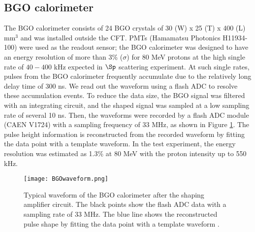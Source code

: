 %
\subsection{BGO calorimeter}
The BGO calorimeter consists of 24 BGO crystals of 30 (W) x 25 (T) x 400 (L) mm$^{3}$ and was installed outside the CFT. PMTs (Hamamatsu Photonics H11934-100) were used as the readout sensor; the BGO calorimeter was designed to have an energy resolution of more than 3\% ($\sigma$) for 80 MeV protons at the high single rate of $40-400$ kHz expected in $\Sp$ scattering experiment. At such single rates, pulses from the BGO calorimeter frequently accumulate due to the relatively long delay time of 300 ns. We read out the waveform using a flash ADC to resolve these accumulation events. To reduce the data size, the BGO signal was filtered with an integrating circuit, and the shaped signal was sampled at a low sampling rate of several 10 ns. Then, the waveforms were recorded by a flash ADC module (CAEN V1724) with a sampling frequency of 33 MHz, as shown in Figure \ref{fig-BGOwaveform}. The pulse height information is reconstructed from the recorded waveform by fitting the data point with a template waveform. In the test experiment, the energy resolution was estimated as 1.3\% at 80 MeV with the proton intensity up to 550 kHz.
\begin{figure}[!h]
 \begin{center}
   \texttt{[image: BGOwaveform.png]}
   \caption{Typical waveform of the BGO calorimeter after the shaping amplifier circuit. The black points show the flash ADC data with a sampling rate of 33 MHz. The blue line shows the reconstructed pulse shape by fitting the data point with a template waveform \cite{Aka-2020}.}
   \label{fig-BGOwaveform}
 \end{center}
\end{figure}

%
